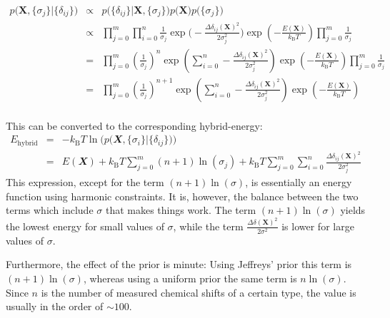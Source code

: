 \begin{eqnarray}
    p\Big(\mathbf X, \{\sigma_j\} \Big| \{\delta_{ij}\} \Big) 
    &\propto& p\Big( \{\delta_{ij}\} \Big| \mathbf X, \{\sigma_j\}\Big)p\Big (\mathbf X \Big) p\Big ( \{\sigma_j\} \Big) \nonumber\\
    &\propto&   \prod_{j=0}^{m} \prod_{i=0}^{n} \frac{1}{\sigma_j} \exp{ \Bigg( - \frac{\Delta\delta_{ij}(\mathbf X)^    2}{2\sigma_j^2} \Bigg) }
    \exp{\left(-\frac{E(\mathbf X)}{k_\mathrm{B}T}\right)}
    \prod_{j=0}^{m} \frac{1}{\sigma_j}\nonumber\\
    & = & \prod_{j=0}^{m} \left( \frac{1}{\sigma_j }\right)^{n} \exp{ \left( \sum_{i=0}^{n} - \frac{\Delta\delta_{ij}(\mathbf X)^2}{2\sigma_j^2} \right)\exp{\left(-\frac{E(\mathbf X)}{k_\mathrm{B}T}\right)}}  \prod_{j=0}^{m} \frac{1}{\sigma_j}\nonumber\\
    & = & \prod_{j=0}^{m} \left( \frac{1}{\sigma_j }\right)^{n+1} \exp{ \left( \sum_{i=0}^{n} - \frac{\Delta\delta_{ij}(\mathbf X)^2}{2\sigma_j^2} \right)\exp{\left(-\frac{E(\mathbf X)}{k_\mathrm{B}T}\right)}}
    \label{eq:gauss_joint}
\end{eqnarray}\\
This can be converted to the corresponding hybrid-energy:
\begin{eqnarray}
    E_{\mathrm{hybrid}}
    & = &- k_\mathrm{B}T \ln{ \Big(p\Big( \mathbfit X, \{\sigma_i\} \Big| \{\delta_{ij}\} \Big)\Big) }\nonumber\\
    & = & E(\mathbfit X) + k_\mathrm{B}T \sum_{j=0}^{m}(n+1) \ln{ \left(\sigma_j \right)} + k_\mathrm{B}T \sum_{j=0}^{m} \sum_{i=0}^{n} \frac{    \Delta\delta_{ij}(\mathbf X)^2}{2\sigma_j^2}
\end{eqnarray}
This expression, except for the term $(n+1) \ln{ \left(\sigma \right)}$, is essentially an energy function using harmonic constraints.
It is, however, the balance between the two terms which include $\sigma$ that makes things work.
The term $(n+1) \ln{ \left(\sigma \right)}$ yields the lowest energy for small values of $\sigma$, while the term $\frac{\Delta\delta (\mathbf X)^2}{2\sigma^2}$ is lower for large values of $\sigma$.

Furthermore, the effect of the prior is minute: Using Jeffreys' prior this term is $(n+1) \ln{\left(\sigma\right)}$, whereas using a uniform prior the same term is $ n \ln{\left(\sigma\right)}$. Since $n$ is the number of measured chemical shifts of a certain type, the value is usually in the order of $\sim 100$.

